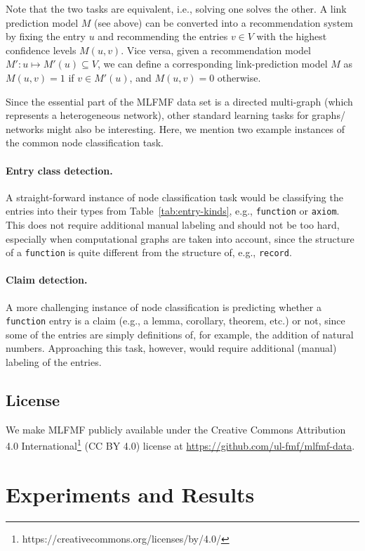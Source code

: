 \documentclass{article}
\begin{document}
Note that the two tasks are equivalent, i.e., solving one solves the other. A link prediction model $M$ (see above) can be converted into a recommendation system by fixing the entry $u$ and recommending the entries $v \in V$ with the highest confidence levels $M(u, v)$. Vice versa, given a recommendation model $M': u \mapsto M'(u)\subseteq V$, we can define a corresponding link-prediction model $M$ as $M(u, v) = 1$ if $v\in M'(u)$, and $M(u, v) = 0$ otherwise.

Since the essential part of the MLFMF data set is a directed multi-graph (which represents a heterogeneous network), other standard learning tasks for graphs/ networks might also be interesting. Here, we mention two example instances of the common node classification task.

\paragraph{Entry class detection.} A straight-forward instance of node classification task would be classifying the entries into their types from Table~\ref{tab:entry-kinds}, e.g., \texttt{function} or \texttt{axiom}. This does not require additional manual labeling and should not be too hard, especially when computational graphs are taken into account, since the structure of a \texttt{function} is quite different from the structure of, e.g., \texttt{record}.

\paragraph{Claim detection.} A more challenging instance of node classification is predicting whether a \texttt{function} entry is a claim (e.g., a lemma, corollary, theorem, etc.) or not, since some of the entries are simply definitions of, for example, the addition of natural numbers. Approaching this task, however, would require additional (manual) labeling of the entries.


\subsection{License}
We make MLFMF publicly available under the Creative Commons Attribution 4.0 International\footnote{https://creativecommons.org/licenses/by/4.0/} (CC BY 4.0) license at \url{https://github.com/ul-fmf/mlfmf-data}.

\section{Experiments and Results}
\end{document}
